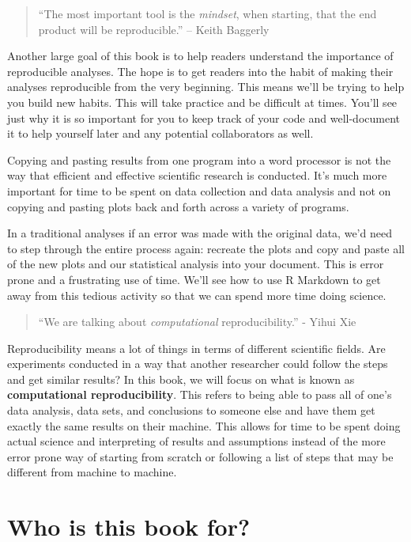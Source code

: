 \documentclass[]{tufte-book}
\theoremstyle{definition}
\theoremstyle{definition}
\theoremstyle{remark}
\begin{document}
\begin{quote}
``The most important tool is the \emph{mindset}, when starting, that the
end product will be reproducible.'' -- Keith Baggerly
\end{quote}

Another large goal of this book is to help readers understand the
importance of reproducible analyses. The hope is to get readers into the
habit of making their analyses reproducible from the very beginning.
This means we'll be trying to help you build new habits. This will take
practice and be difficult at times. You'll see just why it is so
important for you to keep track of your code and well-document it to
help yourself later and any potential collaborators as well.

Copying and pasting results from one program into a word processor is
not the way that efficient and effective scientific research is
conducted. It's much more important for time to be spent on data
collection and data analysis and not on copying and pasting plots back
and forth across a variety of programs.

In a traditional analyses if an error was made with the original data,
we'd need to step through the entire process again: recreate the plots
and copy and paste all of the new plots and our statistical analysis
into your document. This is error prone and a frustrating use of time.
We'll see how to use R Markdown to get away from this tedious activity
so that we can spend more time doing science.

\begin{quote}
``We are talking about \emph{computational} reproducibility.'' - Yihui
Xie
\end{quote}

Reproducibility means a lot of things in terms of different scientific
fields. Are experiments conducted in a way that another researcher could
follow the steps and get similar results? In this book, we will focus on
what is known as \textbf{computational reproducibility}. This refers to
being able to pass all of one's data analysis, data sets, and
conclusions to someone else and have them get exactly the same results
on their machine. This allows for time to be spent doing actual science
and interpreting of results and assumptions instead of the more error
prone way of starting from scratch or following a list of steps that may
be different from machine to machine.

\section{Who is this book for?}\label{who-is-this-book-for}
\end{document}
